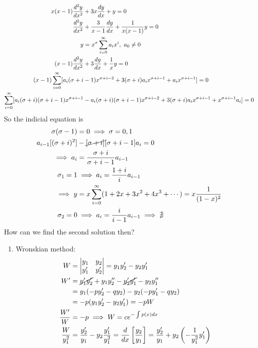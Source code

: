 \documentclass[Maths.tex]{subfiles}
\begin{document}
\begin{example}
\begin{align*}
    x(x-1)\frac{d^2 y}{dx^2} &+ 3x\frac{dy}{dx} + y = 0 \\
    \frac{d^2 y}{dx^2} &+ \frac{3}{x-1}\frac{dy}{dx} + \frac{1}{x(x-1)}y = 0 \\
    y &= x^\sigma \sum_{i=0}^\infty a_ix^i, ~ a_0 \neq 0 \\
    (x-1)\frac{d^2 y}{dx^2} &+ 3\frac{dy}{dx} + \frac{1}{x}y = 0 \\
    (x-1)\sum_{i=0}^\infty [a_i(\sigma + i &- 1)x^{\sigma + i -2} + 3(\sigma + i)a_ix^{\sigma + i - 1} + a_ix^{\sigma+i - 1}] = 0 \\
    \sum_{i=0}^\infty [a_i(\sigma+i)(\sigma+i-1)x^{\sigma+i-1} &- a_i(\sigma+i)(\sigma+i-1)x^{\sigma+i-2} + 3(\sigma+i)a_ix^{\sigma+i-1} + x^{\sigma+i-1}a_i] = 0
\end{align*}
So the indicial equation is
\begin{align*}
    \sigma(\sigma - 1) &= 0 \implies \sigma = 0,1 \\
    a_{i-1}[(\sigma+i)^2] &- \cancel{[\sigma+i]}[\sigma+i-1]a_i = 0 \\
    \implies a_i &= \frac{\sigma+i}{\sigma+i-1}a_{i-1} \\
    \sigma_1 = 1 &\implies a_i = \frac{1+i}{i}a_{i-1} \\
    \implies y &= x\sum_{i=0}^\infty (1 + 2x + 3x^2 + 4x^3 + \cdots) = x\frac{1}{(1-x)^2} \\
    \sigma_2 = 0 &\implies a_i = \frac{i}{i-1}a_{i-1} \implies \nexists
\end{align*}
How can we find the second solution then?
\begin{enumerate}
    \item Wronskian method:
    \begin{align*}
        W &= \begin{vmatrix} y_1 & y_2 \\ y'_1 & y'_2 \end{vmatrix} = y_1y'_2 - y_2y'_1 \\
        W' &= \cancel{y'_1y'_2} + y_1y''_2 - \cancel{y'_2y'_1} - y_2y''_1 \\
        &= y_1(-py'_2 - qy_2) - y_2(-py'_1 - qy_2) \\
        &= -p(y_1y'_2 - y_2y'_1) = -pW \\
        \frac{W'}{W} &= -p \implies W = ce^{-\int p(x)dx} \\
        \frac{W}{y_1^2} &= \frac{y'_2}{y_1} - y_2\frac{y'_1}{y_1^2} = \frac{d}{dx}\left[\frac{y_2}{y_1}\right] = \frac{y'_2}{y_1} + y_2\left(-\frac{1}{y_1^2}y'_1\right) \\

\end{align*}
\end{enumerate}
\end{example}
\end{document}
